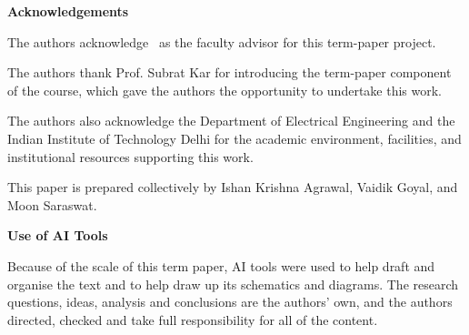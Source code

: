 \clearpage
\thispagestyle{ell305}
\vspace*{0.14\textheight}

\begin{center}
  {\Large\bfseries Acknowledgements\par}
\end{center}

\vspace{1.2cm}

The authors acknowledge \facultyadvisor\ as the faculty advisor for this term-paper project.

The authors thank Prof. Subrat Kar for introducing the term-paper component of the course, which gave the authors the opportunity to undertake this work.

The authors also acknowledge the Department of Electrical Engineering and the Indian Institute of Technology Delhi for the academic environment, facilities, and institutional resources supporting this work.

This paper is prepared collectively by Ishan Krishna Agrawal, Vaidik Goyal, and Moon Saraswat.

\vspace{1.0cm}

\begin{center}
  {\large\bfseries Use of AI Tools\par}
\end{center}

\vspace{0.3cm}

Because of the scale of this term paper, AI tools were used to help draft and organise the text and to help draw up its schematics and diagrams. The research questions, ideas, analysis and conclusions are the authors' own, and the authors directed, checked and take full responsibility for all of the content.
